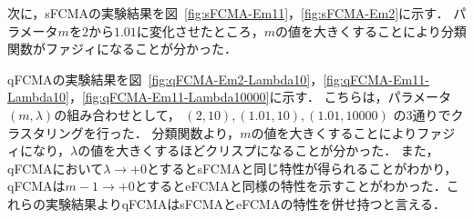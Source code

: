 \documentclass[twocolumn, a4paper]{icethesisabst}
\begin{document}
次に，sFCMAの実験結果を図~\ref{fig:sFCMA-Em11}，\ref{fig:sFCMA-Em2}に示す．
パラメータ$m$を$2$から$1.01$に変化させたところ，$m$の値を大きくすることにより分類関数がファジィになることが分かった．

qFCMAの実験結果を図~\ref{fig:qFCMA-Em2-Lambda10}，\ref{fig:qFCMA-Em11-Lambda10}，\ref{fig:qFCMA-Em11-Lambda10000}に示す．
こちらは，パラメータ$(m, \lambda)$の組み合わせとして，
$(2, 10), (1.01, 10), (1.01, 10000)$
の3通りでクラスタリングを行った．
分類関数より，$m$の値を大きくすることによりファジィになり，$\lambda$の値を大きくするほどクリスプになることが分かった．
また，qFCMAにおいて$\lambda\rightarrow+0$とするとsFCMAと同じ特性が得られることがわかり，qFCMAは$m-1\rightarrow+0$とするとeFCMAと同様の特性を示すことがわかった．これらの実験結果よりqFCMAはsFCMAとeFCMAの特性を併せ持つと言える．
\end{document}
